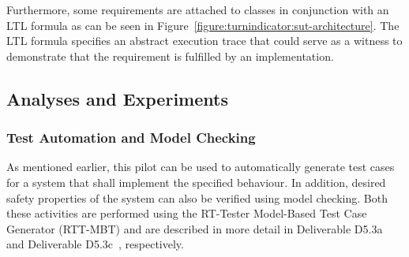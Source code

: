 Furthermore, some requirements are attached to classes in conjunction with an LTL formula
as can be seen in Figure~\ref{figure:turnindicator:sut-architecture}.
The LTL formula specifies an abstract execution trace that could serve as a witness
to demonstrate that the requirement is fulfilled by an implementation.

\subsection{Analyses and Experiments}

\subsubsection{Test Automation and Model Checking}
As mentioned earlier, this pilot can be used to automatically generate
test cases for a system that shall implement the specified behaviour.
In addition, desired safety properties of the system can also be verified using
model checking.
Both these activities are performed using the RT-Tester Model-Based Test
Case Generator (RTT-MBT) and are described in more detail
in Deliverable D5.3a~\cite{INTOCPSD5.3a} and Deliverable D5.3c~\cite{INTOCPSD5.3c}, respectively.
